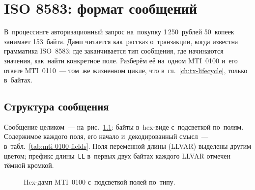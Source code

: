 
\chapter{ISO 8583: формат сообщений}\label{ch:iso8583}

В~процессинге авторизационный запрос на~покупку 1\,250~рублей 50~копеек
занимает 153~байта. Дамп читается как~рассказ о~транзакции, когда известна
грамматика ISO~8583: где заканчивается тип сообщения, где начинаются значения,
как~найти конкретное поле. Разберём её на~одном MTI~0100 и~его ответе
MTI~0110~--- том~же жизненном цикле, что в~гл.~\ref{ch:tx-lifecycle}, только
в~байтах.

\section{Структура сообщения}\label{sec:iso8583-structure}

Сообщение целиком~--- на~рис.~\ref{fig:mti-0100-anatomy}: байты в~hex-виде
с~подсветкой по~полям. Содержимое каждого поля, его начало и~декодированный
смысл~--- в~табл.~\ref{tab:mti-0100-fields}. Поля переменной длины (LLVAR)
выделены другим цветом; префикс длины~\texttt{LL} в~первых двух байтах каждого
LLVAR отмечен тёмной кромкой.

\begin{figure}[tbp]
  \centering
  \caption{Hex-дамп MTI~0100 с~подсветкой полей по~типу.}\label{fig:mti-0100-anatomy}
\end{figure}

